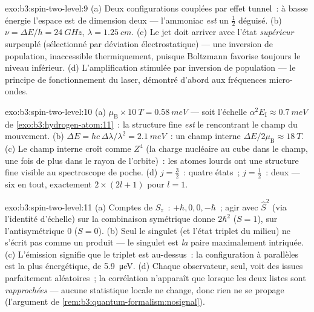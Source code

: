 \begin{solution}{exo:b3:spin-two-level:9}
(a) Deux configurations couplées par effet tunnel~: à basse énergie
l'espace est de dimension deux --- l'ammoniac \emph{est} un 
$\tfrac12$ déguisé. (b) $\nu = \Delta E/h = \qty{24}{GHz}$, $\lambda =
\qty{1.25}{cm}$. (c) Le jet doit arriver avec l'état \emph{supérieur}
surpeuplé (sélectionné par déviation électrostatique) --- une
inversion de population, inaccessible thermiquement, puisque Boltzmann
favorise toujours le niveau inférieur. (d) L'amplification stimulée
par inversion de population --- le principe de fonctionnement du
laser, démontré d'abord aux fréquences micro-ondes.
\end{solution}

\begin{solution}{exo:b3:spin-two-level:10}
(a) $\mu_{\text{B}} \times \qty{10}{T} = \qty{0.58}{meV}$ --- soit
l'échelle $\alpha^2E_{\text{I}} \approx \qty{0.7}{meV}$ de
\cref{exo:b3:hydrogen-atom:11}~: la structure fine \emph{est} le 
rencontrant le champ du mouvement. (b) $\Delta E = hc\,\Delta\lambda/
\lambda^2 = \qty{2.1}{meV}$~: un champ interne $\Delta E/2\mu_{
\text{B}} \approx \qty{18}{T}$. (c) Le champ interne croît comme
$Z^4$ (la charge nucléaire au cube dans le champ, une fois de plus
dans le rayon de l'orbite)~: les atomes lourds ont une structure fine
visible au spectroscope de poche. (d) $j = \tfrac32$~: quatre états~;
$j = \tfrac12$~: deux --- six en tout, exactement $2 \times (2l + 1)$
pour $l = 1$.
\end{solution}

\begin{solution}{exo:b3:spin-two-level:11}
(a) Comptes de $S_z$~: $+\hbar, 0, 0, -\hbar$~; agir avec $\hat S^2$
(via l'identité d'échelle) sur la combinaison symétrique donne
$2\hbar^2$ ($S = 1$), sur l'antisymétrique $0$ ($S = 0$). (b)
Seul le singulet (et l'état triplet du milieu) ne s'écrit pas comme
un produit --- le singulet est \emph{la} paire maximalement intriquée.
(c) L'émission signifie que le triplet est au-dessus~: la
configuration à  parallèles est la plus énergétique, de
\qty{5.9}{\micro eV}. (d) Chaque observateur, seul, voit des issues
parfaitement aléatoires~; la corrélation n'apparaît que lorsque les
deux listes sont \emph{rapprochées} --- aucune statistique locale ne
change, donc rien ne se propage (l'argument de
\cref{rem:b3:quantum-formalism:nosignal}).
\end{solution}

